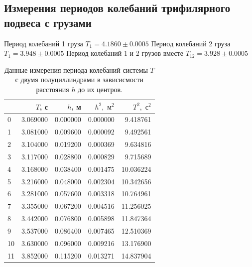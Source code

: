 \documentclass[12pt]{article}
\begin{document}
\subsection{Измерения периодов колебаний трифилярного подвеса с грузами} \label{app_4}
Период колебаний 1 груза $T_1 = 4.1860 \pm 0.0005$
Период колебаний 2 груза $T_1 = 3.948 \pm 0.0005$
Период колебаний 1 и 2 грузов вместе $T_{12} = 3.928 \pm 0.0005$
\begin{table}[H]
    \centering
    \begin{tabular}{|l|r|r|r|r|}
        \hline
           & $T$, с   & $h$, м   & $h^2, \textrm{ м}^2$ & $T^2, \textrm{ с}^2$ \\
        \hline
        0  & 3.069000 & 0.000000 & 0.000000             & 9.418761             \\
        1  & 3.081000 & 0.009600 & 0.000092             & 9.492561             \\
        2  & 3.104000 & 0.019200 & 0.000369             & 9.634816             \\
        3  & 3.117000 & 0.028800 & 0.000829             & 9.715689             \\
        4  & 3.168000 & 0.038400 & 0.001475             & 10.036224            \\
        5  & 3.216000 & 0.048000 & 0.002304             & 10.342656            \\
        6  & 3.281000 & 0.057600 & 0.003318             & 10.764961            \\
        7  & 3.355000 & 0.067200 & 0.004516             & 11.256025            \\
        8  & 3.442000 & 0.076800 & 0.005898             & 11.847364            \\
        9  & 3.537000 & 0.086400 & 0.007465             & 12.510369            \\
        10 & 3.630000 & 0.096000 & 0.009216             & 13.176900            \\
        11 & 3.852000 & 0.115200 & 0.013271             & 14.837904            \\
        \hline
    \end{tabular}
    
    \caption{Данные измерения периода колебаний системы $T$ с двумя полуциллиндрами в зависисмости расстояния $h$ до их центров.}
    \label{tab:2}
\end{table}
\end{document}

